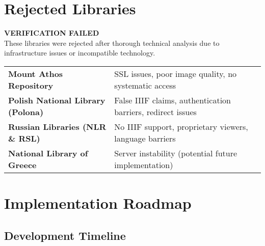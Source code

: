 \documentclass[11pt,a4paper]{article}
\begin{document}
\section{Rejected Libraries}

\begin{dangerbox}
\textbf{\faTimes{} VERIFICATION FAILED}\\
These libraries were rejected after thorough technical analysis due to infrastructure issues or incompatible technology.
\end{dangerbox}

\begin{tabularx}{\textwidth}{lX}
\toprule
\textbf{Mount Athos Repository} & SSL issues, poor image quality, no systematic access \\
\textbf{Polish National Library (Polona)} & False IIIF claims, authentication barriers, redirect issues \\
\textbf{Russian Libraries (NLR \& RSL)} & No IIIF support, proprietary viewers, language barriers \\
\textbf{National Library of Greece} & Server instability (potential future implementation) \\
\bottomrule
\end{tabularx}

\section{Implementation Roadmap}

\subsection{Development Timeline}
\end{document}
